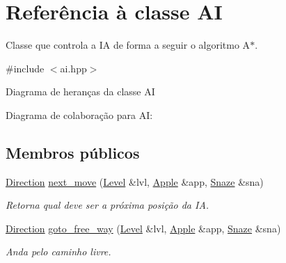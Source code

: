 \hypertarget{classAI}{}\section{Referência à classe AI}
\label{classAI}


Classe que controla a IA de forma a seguir o algoritmo A$\ast$.  




{\ttfamily \#include $<$ai.\+hpp$>$}



Diagrama de heranças da classe AI


Diagrama de colaboração para AI\+:
\subsection*{Membros públicos}
\begin{DoxyCompactItemize}
\item 
\hyperlink{game__classes_8hpp_a224b9163917ac32fc95a60d8c1eec3aa}{Direction} \hyperlink{classAI_a53dddd1401e27e826362de53d82b3f50}{next\+\_\+move} (\hyperlink{classLevel}{Level} \&lvl, \hyperlink{classApple}{Apple} \&app, \hyperlink{classSnaze}{Snaze} \&sna)
\begin{DoxyCompactList}\small\item\em Retorna qual deve ser a próxima posição da IA. \end{DoxyCompactList}\item 
\hyperlink{game__classes_8hpp_a224b9163917ac32fc95a60d8c1eec3aa}{Direction} \hyperlink{classAI_ab74866f1d674f96d1a7ae37b6b677982}{goto\+\_\+free\+\_\+way} (\hyperlink{classLevel}{Level} \&lvl, \hyperlink{classApple}{Apple} \&app, \hyperlink{classSnaze}{Snaze} \&sna)
\begin{DoxyCompactList}\small\item\em Anda pelo caminho livre. \end{DoxyCompactList}\end{DoxyCompactItemize}
